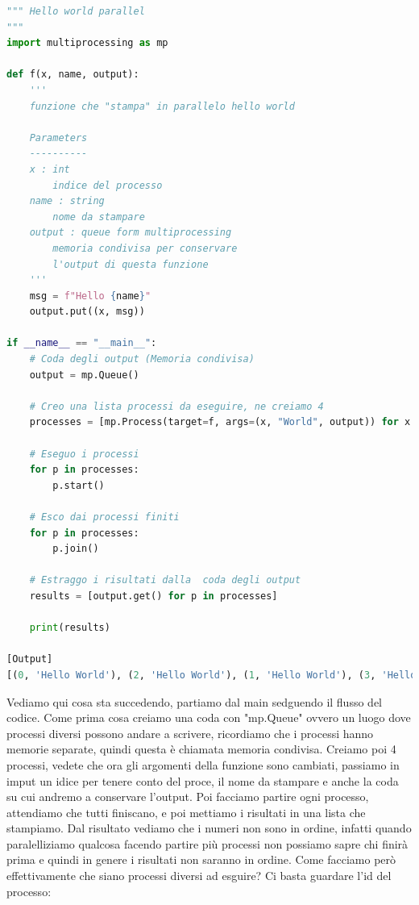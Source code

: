 \documentclass[10pt,a4paper]{article}
\begin{document}
\begin{lstlisting}[language=Python]
""" Hello world parallel
"""
import multiprocessing as mp

def f(x, name, output):
    '''
    funzione che "stampa" in parallelo hello world

    Parameters
    ----------
    x : int
        indice del processo
    name : string
        nome da stampare
    output : queue form multiprocessing
        memoria condivisa per conservare
        l'output di questa funzione 
    '''
    msg = f"Hello {name}"
    output.put((x, msg))

if __name__ == "__main__":
    # Coda degli output (Memoria condivisa)
    output = mp.Queue()

    # Creo una lista processi da eseguire, ne creiamo 4
    processes = [mp.Process(target=f, args=(x, "World", output)) for x in range(4)]

    # Eseguo i processi
    for p in processes:
        p.start()

    # Esco dai processi finiti
    for p in processes:
        p.join()

    # Estraggo i risultati dalla  coda degli output
    results = [output.get() for p in processes]

    print(results)

[Output]
[(0, 'Hello World'), (2, 'Hello World'), (1, 'Hello World'), (3, 'Hello World')]
\end{lstlisting}
Vediamo qui cosa sta succedendo, partiamo dal main sedguendo il flusso del codice. Come prima cosa creiamo una coda con "mp.Queue" ovvero un luogo dove processi diversi possono andare a scrivere, ricordiamo che i processi hanno memorie separate, quindi questa è chiamata memoria condivisa. Creiamo poi 4 processi, vedete che ora gli argomenti della funzione sono cambiati, passiamo in imput un idice per tenere conto del proce, il nome da stampare e anche la coda su cui andremo a conservare l'output. Poi facciamo partire ogni processo, attendiamo che tutti finiscano, e poi mettiamo i risultati in una lista che stampiamo. Dal risultato vediamo che i numeri non sono in ordine, infatti quando paralelliziamo qualcosa facendo partire più processi non possiamo sapre chi finirà prima e quindi in genere i risultati non saranno in ordine. Come facciamo però effettivamente che siano processi diversi ad esguire? Ci basta guardare l'id del processo:
\end{document}
